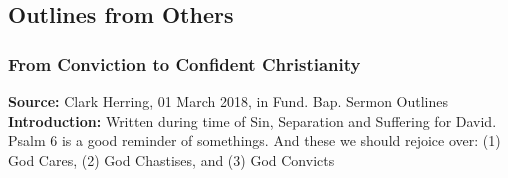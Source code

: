 \subsection{Outlines from Others}

\subsubsection{From Conviction to Confident Christianity}
\textbf{Source: } Clark Herring, 01 March 2018, in Fund. Bap. Sermon Outlines\\
\textbf{Introduction: } Written during time of Sin, Separation and Suffering for David. Psalm 6 is a good reminder of somethings. And these we should rejoice over: (1) God Cares,
(2) God Chastises, and (3) God Convicts
